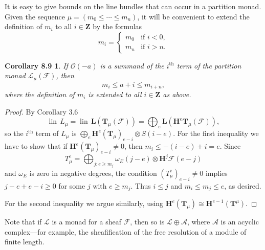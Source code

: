 \documentclass{tran-l}
\newcommand{\tensor}{\otimes}
\newcommand{\lin}{\operatorname{lin}}
\newcommand{\myth}{{\operatorname{th}}}
\newcommand{\A}{\mathcal{A}}
\newcommand{\F}{\mathcal{F}}
\newcommand{\myH}{\mathbf{H}}
\newcommand{\LL}{\mathbf{L}}
\newcommand{\TT}{\mathbf{T}}
\newcommand{\Z}{\mathbf{Z}}
\theoremstyle{plain}
\newtheorem*{theorem33}{Corollary 8.9}
\theoremstyle{remark}
\theoremstyle{definition}
\begin{document}
It is easy to give bounds on the line bundles that
can occur in a partition monad.
Given the sequence  $\mu =(m_{0}\leq \cdots \leq m_{n})$,
it will be
convenient to extend the definition of $m_{i}$ to all $i\in \Z $
by the formulas
\begin{equation*}m_{i}=\begin{cases}m_{0} &\text{if $i<0$},\\
          m_{n} & \text{if $i>n$}.\end{cases}
\end{equation*}
\begin{theorem33}
If $\mathcal{O} (-a)$ is a summand of the $i^{\myth }$ term of the partition monad
$\mathcal{L}_{\mu }(\F )$,  then
\begin{equation*}m_{i}  \leq a+i \leq m_{i+n},
\end{equation*}
where the definition of $m_{i}$ is extended to all $i \in \Z $ as
above. 
\end{theorem33}
\begin{proof}  By Corollary 3.6
\begin{equation*}\lin \,L_{\mu }=\lin \, \LL ( \TT _{\mu }(\F ))= \bigoplus _{e} \LL (\myH ^{e} \TT _{\mu }(\F )),
\end{equation*}
so the $i^{\myth }$ term  of $L_{\mu }$ is
$ \bigoplus _{e} \myH ^{e}(\TT _{\mu })_{e-i} \tensor S(i-e).$
For the first inequality we have to show that if
$\myH ^{e}(\TT _{\mu })_{e-i} \not = 0$, then $m_{i}\leq -(i-e)+i=e$. Since
\begin{equation*}
T^{e}_{\mu }= \bigoplus _{j: e \ge m_{j}} \omega _{E}(j-e) \tensor \myH ^{j}\F (e-j)
\end{equation*}
and $\omega _{E}$ is zero in negative degrees, the condition
$(T^{e}_{\mu })_{e-i} \not =0$ implies $j-e+e-i \ge 0$ for some $j$ with $e \ge m_{j}$.
Thus $i \leq j$ and $m_{i}\leq m_{j}\leq e$, as desired.

For the second inequality we argue similarly, using
$\myH ^{e}(\TT _{\mu }) \cong \myH ^{e-1}(\TT ^{\mu }).$
\end{proof}


Note that if $\mathcal{L}$ is a monad for a sheaf $\F $, then so is
$\mathcal{L}\oplus \A $, where
$\A $ is an acyclic complex---for example, the
sheafification of the free resolution of a module of finite length.
\end{document}
